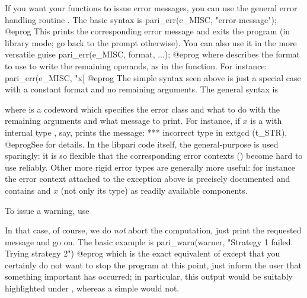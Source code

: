 



\noindent
If you want your functions to issue error messages, you can use the general
error handling routine . The basic syntax is
%
\bprog
  pari_err(e_MISC, "error message");
@eprog\noindent
This prints the corresponding error message and exits the program (in
library mode; go back to the  prompt otherwise).\label{se:err} You can
also use it in the more versatile guise
\bprog
  pari_err(e_MISC, format, ...);
@eprog\noindent
where  describes the format to use to write the remaining
operands, as in the  function. For instance:
\bprog
  pari_err(e_MISC, "x[%
@eprog\noindent
The simple syntax seen above is just a special case with a constant format
and no remaining arguments. The general syntax is


\noindent where  is a codeword which specifies the error class
and what to do with the remaining arguments and what message to print.
For instance, if $x$ is a  with internal type , say,
 prints the message:
\bprog
    ***   incorrect type in extgcd (t_STR),
@eprog\noindent See  for details. In the libpari code
itself, the general-purpose  is used sparingly: it is so
flexible that the corresponding error contexts () become hard to
use reliably. Other more rigid error types are generally more useful: for
instance the error context attached to the  exception above is
precisely documented and contains  and $x$ (not only its type)
as readily available components.


\noindent To issue a warning, use

In that case, of course, we do \emph{not} abort the computation, just print
the requested message and go on. The basic example is
%
\bprog
    pari_warn(warner, "Strategy 1 failed. Trying strategy 2")
@eprog\noindent
which is the exact equivalent of  except that
you certainly do not want to stop the program at this point, just inform the
user that something important has occurred; in particular, this output would be
suitably highlighted under , whereas a simple  would not.

